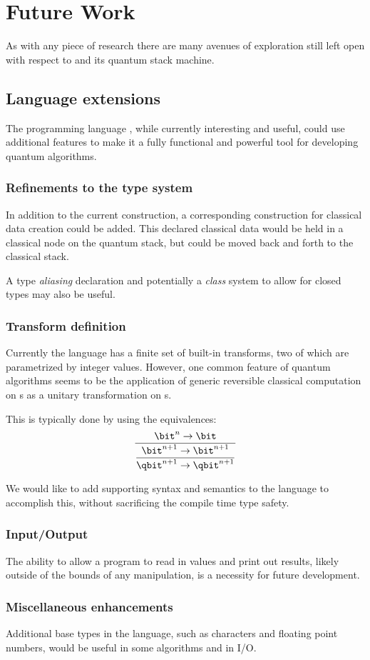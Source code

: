 \chapter{Future Work}\label{chap:futurework}
As with any piece of research there are many avenues of exploration 
still left open with respect to \lqpl{} and its quantum stack machine.

\section{Language extensions}\label{sec:languageextensions}
The programming language \lqpl{}, while currently interesting and
useful, could use additional features to make it a fully functional and
powerful tool for developing quantum algorithms.

\subsection{Refinements to the type system}\label{subsec:typesystem}
In addition to the current  construction, a corresponding
construction for classical data creation could be added. This 
declared classical data would be held in a classical node on the
quantum stack, but could be moved back and forth to the classical stack.

A type \emph{aliasing} declaration and potentially a \emph{class} system
to allow for closed types may also be useful.

\subsection{Transform definition}\label{subsec:transformdefinition}
Currently the language has a finite set of built-in transforms, two of
which are parametrized by integer values. However, one common feature of 
quantum algorithms seems to be the application of generic reversible 
classical computation on \bit{}s as a unitary transformation on \qbit{}s.

This is typically done by using the equivalences:
\[
\genfrac{}{}{}{}{\bit^n \rightarrow \bit}{%
\genfrac{}{}{}{0}{\bit^{n+1} \rightarrow \bit^{n+1}}{%
\qbit^{n+1} \rightarrow \qbit^{n+1}}}
\]

We would like to add supporting syntax and semantics to the language to 
accomplish this, without sacrificing the compile time type safety.

\subsection{Input/Output}\label{subsec:inputoutput}
The ability to allow a program to read in values and print out results, 
likely outside of the bounds of any \qbit{} manipulation, is a necessity 
for future development.

\subsection{Miscellaneous enhancements}\label{subsec:miscellaneousenhancements}
Additional base types in the language, such as characters and floating
point numbers, would be useful in some algorithms and in I/O.
